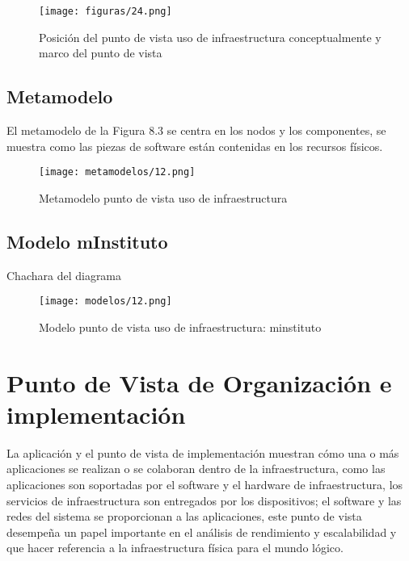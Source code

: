   \begin{figure}[!h]
  	\centering
  	\texttt{[image: figuras/24.png]}
  	\captionsetup{width=.95\textwidth}
  	\caption{Posición del punto de vista uso de infraestructura conceptualmente y marco del punto de vista}
  	\label{figura24}
  \end{figure}
  
  \subsection{Metamodelo}
  El metamodelo de la Figura 8.3 se centra en los nodos y los componentes, se muestra como las piezas de software están contenidas en los recursos físicos.
  
  \begin{figure}[!h]
  	\centering
  	\texttt{[image: metamodelos/12.png]}
  	\captionsetup{width=.95\textwidth}
  	\caption{Metamodelo punto de vista uso de infraestructura}
  	\label{metamodelo12}
  \end{figure}
  
  \subsection{Modelo mInstituto}Chachara del diagrama
  \begin{figure}[!h]
  	\centering
  	\texttt{[image: modelos/12.png]}
  	\captionsetup{width=.95\textwidth}
  	\caption{Modelo punto de vista uso de infraestructura: minstituto}
  	\label{modelo12}
  \end{figure}
  
  \section{Punto de Vista de Organización e implementación}
  La aplicación y el punto de vista de implementación muestran cómo una o más aplicaciones se realizan o se colaboran dentro de la infraestructura, como las aplicaciones son soportadas por el software y el hardware de infraestructura, los servicios de infraestructura son entregados por los dispositivos; el software y las redes del sistema se proporcionan a las aplicaciones, este punto de vista desempeña un papel importante en el análisis de rendimiento y escalabilidad y que hacer referencia a la infraestructura física para el mundo
  lógico.
  
